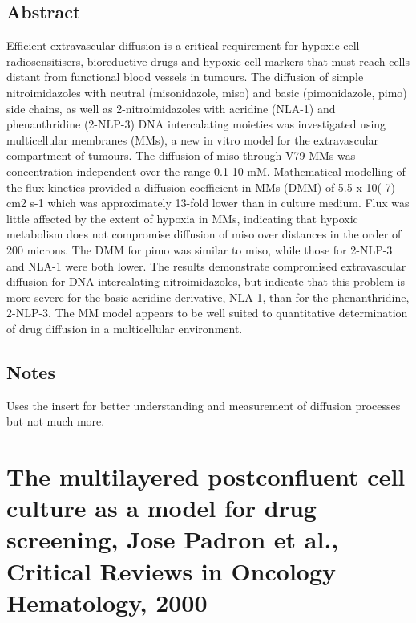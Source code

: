 \documentclass[11pt,a4paper]{article}
\begin{document}
\subsection*{Abstract}
Efficient extravascular diffusion is a critical requirement for hypoxic cell radiosensitisers, bioreductive drugs and hypoxic cell markers that must reach cells distant from functional blood vessels in tumours. The diffusion of simple nitroimidazoles with neutral (misonidazole, miso) and basic (pimonidazole, pimo) side chains, as well as 2-nitroimidazoles with acridine (NLA-1) and phenanthridine (2-NLP-3) DNA intercalating moieties was investigated using multicellular membranes (MMs), a new in vitro model for the extravascular compartment of tumours. The diffusion of miso through V79 MMs was concentration independent over the range 0.1-10 mM. Mathematical modelling of the flux kinetics provided a diffusion coefficient in MMs (DMM) of 5.5 x 10(-7) cm2 s-1 which was approximately 13-fold lower than in culture medium. Flux was little affected by the extent of hypoxia in MMs, indicating that hypoxic metabolism does not compromise diffusion of miso over distances in the order of 200 microns. The DMM for pimo was similar to miso, while those for 2-NLP-3 and NLA-1 were both lower. The results demonstrate compromised extravascular diffusion for DNA-intercalating nitroimidazoles, but indicate that this problem is more severe for the basic acridine derivative, NLA-1, than for the phenanthridine, 2-NLP-3. The MM model appears to be well suited to quantitative determination of drug diffusion in a multicellular environment.

\subsection*{Notes}
Uses the insert for better understanding and measurement of diffusion processes but not much more.

\section*{The multilayered postconfluent cell culture as a model for drug screening, Jose Padron et al., Critical Reviews in Oncology Hematology, 2000}
\end{document}
